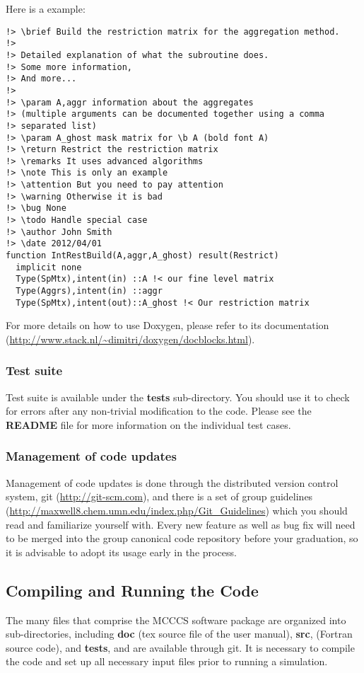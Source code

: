 \documentclass[12pt,letterpaper]{article}
\begin{document}
Here is a example:
\begin{verbatim}
!> \brief Build the restriction matrix for the aggregation method.
!>
!> Detailed explanation of what the subroutine does.
!> Some more information,
!> And more...
!>
!> \param A,aggr information about the aggregates
!> (multiple arguments can be documented together using a comma
!> separated list)
!> \param A_ghost mask matrix for \b A (bold font A)
!> \return Restrict the restriction matrix
!> \remarks It uses advanced algorithms
!> \note This is only an example
!> \attention But you need to pay attention
!> \warning Otherwise it is bad
!> \bug None
!> \todo Handle special case
!> \author John Smith
!> \date 2012/04/01
function IntRestBuild(A,aggr,A_ghost) result(Restrict)
  implicit none
  Type(SpMtx),intent(in) ::A !< our fine level matrix
  Type(Aggrs),intent(in) ::aggr
  Type(SpMtx),intent(out)::A_ghost !< Our restriction matrix
\end{verbatim}

For more details on how to use Doxygen, please refer to its
documentation
(\url{http://www.stack.nl/~dimitri/doxygen/docblocks.html}).

\subsubsection{Test suite}
Test suite is available under the {\bf tests} sub-directory.
You should use it to check for errors after any non-trivial
modification to the code. Please see the {\bf README} file
for more information on the individual test cases.

\subsubsection{Management of code updates}
Management of code updates is done through the distributed
version control system, git (\url{http://git-scm.com}), and
there is a set of group guidelines
(\url{http://maxwell8.chem.umn.edu/index.php/Git_Guidelines})
which you should read and familiarize yourself with. Every
new feature as well as bug fix will need to be merged into
the group canonical code repository before your graduation,
so it is advisable to adopt its usage early in the process.

\subsection{Compiling and Running the Code}
\label{compile}
The many files that comprise the MCCCS software package are
organized into sub-directories, including {\bf doc} (tex
source file of the user manual), {\bf src}, (Fortran source
code), and {\bf tests}, and are available through git. It is
necessary to compile the code and set up all necessary input
files prior to running a simulation.
\end{document}
